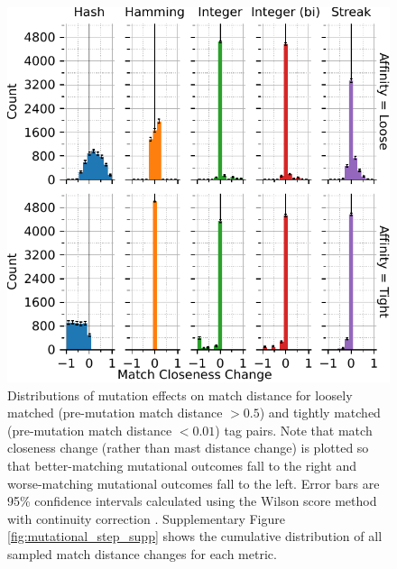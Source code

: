 \begin{figure}[!htbp]
\begin{center}

\includegraphics[width=\columnwidth]{img/mutational_step/bitweight=0dot5+seed=1+title=low-mutational-step+viz=hist+_data_hathash_hash=95a57768de56995a+_script_fullcat_hash=aa068ad24b386169+ext=}
\caption{
Distributions of mutation effects on match distance for loosely matched (pre-mutation match distance $> 0.5$) and tightly matched (pre-mutation match distance $< 0.01$) tag pairs.
Note that match closeness change (rather than mast distance change) is plotted so that better-matching mutational outcomes fall to the right and worse-matching mutational outcomes fall to the left.
Error bars are 95\% confidence intervals calculated using the Wilson score method with continuity correction \citep{newcombe1998two}.
Supplementary Figure \ref{fig:mutational_step_supp} shows the cumulative distribution of all sampled match distance changes for each metric.
}
\label{fig:mutational_step}

\end{center}
\end{figure}

